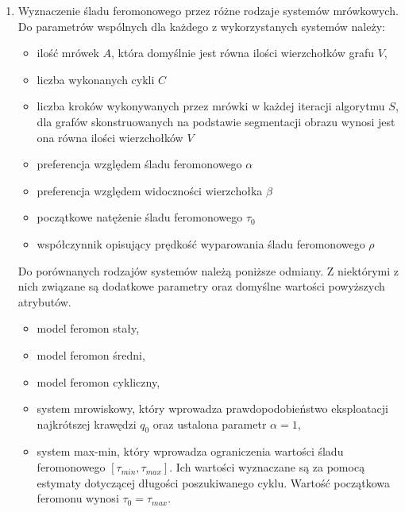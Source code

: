 {{{\begin{enumerate}
                \item Wyznaczenie śladu feromonowego przez różne rodzaje systemów mrówkowych. Do parametrów wspólnych
                dla każdego z wykorzystanych systemów należy:
                \begin{itemize}
                    \item ilość mrówek $A$, która domyślnie jest równa ilości wierzchołków grafu $V$,
                    \item liczba wykonanych cykli $C$
                    \item liczba kroków wykonywanych przez mrówki w każdej iteracji algorytmu $S$, dla grafów
                    skonstruowanych na podstawie segmentacji obrazu wynosi jest ona równa ilości wierzchołków $V$
                    \item preferencja względem śladu feromonowego $\alpha$
                    \item preferencja względem widoczności wierzchołka $\beta$
                    \item początkowe natężenie śladu feromonowego $\tau_0$
                    \item współczynnik opisujący prędkość wyparowania śladu feromonowego $\rho$
                \end{itemize}

                Do porównanych rodzajów systemów należą poniższe odmiany. Z niektórymi z nich związane są dodatkowe
                parametry oraz domyślne wartości powyższych atrybutów.
                \begin{itemize}
                    \item model feromon stały,
                    \item model feromon średni,
                    \item model feromon cykliczny,
                    \item system mrowiskowy, który wprowadza prawdopodobieństwo eksploatacji najkrótszej krawędzi $q_0$
                    oraz ustalona parametr $\alpha = 1$,
                    \item system max-min, który wprowadza ograniczenia wartości śladu feromonowego $[\tau_{min},
                    \tau_{max}]$. Ich wartości wyznaczane są za pomocą estymaty dotyczącej długości poszukiwanego cyklu.
                    Wartość początkowa feromonu wynosi $\tau_0 = \tau_{max}$.
                \end{itemize}
            \end{enumerate}
        }
    }

}
